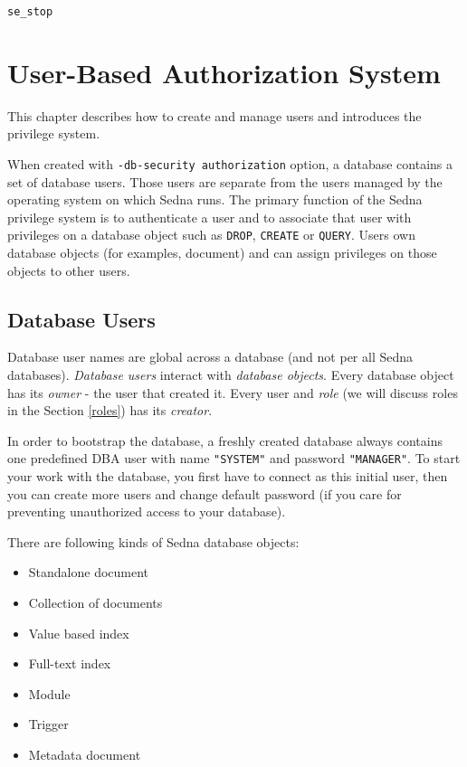 \documentclass[a4paper,12pt]{article}
\newenvironment{citemize}
{\begin{itemize}
  \setlength{\itemsep}{0pt}
  \setlength{\parskip}{0pt}
  \setlength{\parsep}{0pt}}
{\end{itemize}}
\begin{document}
\begin{verbatim}
se_stop
\end{verbatim}

\section{User-Based Authorization System}

This chapter describes how to create and manage users and introduces the
privilege system.

When created with \verb!-db-security authorization! option, a database contains
a set of database users. Those users are separate from the users managed by the
operating system on which Sedna runs. The primary function of the Sedna
privilege system is to authenticate a user and to associate that user with
privileges on a database object such as \verb!DROP!, \verb!CREATE! or
\verb!QUERY!. Users own database objects (for examples, document) and can
assign privileges on those objects to other users.


\subsection{Database Users}

Database user names are global across a database (and not per all Sedna
databases). \emph{Database users} interact with \emph{database objects}. Every
database object has its \emph{owner} - the user that created it. Every user and
\emph{role} (we will discuss roles in the Section \ref{roles}) has its
\emph{creator}.

In order to bootstrap the database, a freshly created database always contains
one predefined DBA user with name \verb!"SYSTEM"! and password \verb!"MANAGER"!.
To start your work with the database, you first have to connect as this initial
user, then you can create more users and change default password (if you care
for preventing unauthorized access to your database).

There are following kinds of Sedna database objects:
\begin{citemize}
\item Standalone document
\item Collection of documents
\item Value based index
\item Full-text index
\item Module
\item Trigger
\item Metadata document
\end{citemize}
\end{document}

